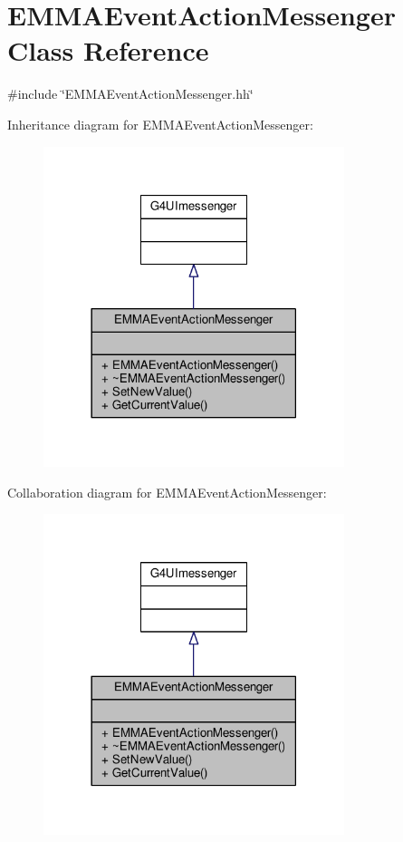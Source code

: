 \hypertarget{classEMMAEventActionMessenger}{}\section{E\+M\+M\+A\+Event\+Action\+Messenger Class Reference}
\label{classEMMAEventActionMessenger}


{\ttfamily \#include \char`\"{}E\+M\+M\+A\+Event\+Action\+Messenger.\+hh\char`\"{}}



Inheritance diagram for E\+M\+M\+A\+Event\+Action\+Messenger\+:
\nopagebreak
\begin{figure}[H]
\begin{center}
\leavevmode
\includegraphics[width=249pt]{classEMMAEventActionMessenger__inherit__graph}
\end{center}
\end{figure}


Collaboration diagram for E\+M\+M\+A\+Event\+Action\+Messenger\+:
\nopagebreak
\begin{figure}[H]
\begin{center}
\leavevmode
\includegraphics[width=249pt]{classEMMAEventActionMessenger__coll__graph}
\end{center}
\end{figure}
